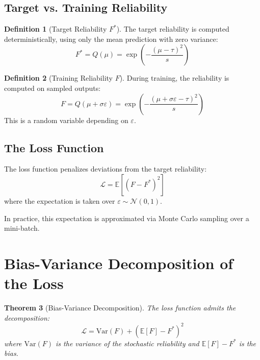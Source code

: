 \documentclass[11pt,a4paper]{article}
\newtheorem{theorem}{Theorem}
\theoremstyle{definition}
\newtheorem{definition}[theorem]{Definition}
\newcommand{\E}{\mathbb{E}}
\newcommand{\Var}{\mathrm{Var}}
\newcommand{\N}{\mathcal{N}}
\begin{document}
\subsection{Target vs. Training Reliability}

\begin{definition}[Target Reliability $F^*$]
The target reliability is computed deterministically, using only the mean prediction with zero variance:
\begin{equation}
    F^* = Q(\mu) = \exp\left(-\frac{(\mu - \tau)^2}{s}\right)
\end{equation}
\end{definition}

\begin{definition}[Training Reliability $F$]
During training, the reliability is computed on sampled outputs:
\begin{equation}
    F = Q(\mu + \sigma\varepsilon) = \exp\left(-\frac{(\mu + \sigma\varepsilon - \tau)^2}{s}\right)
\end{equation}
This is a random variable depending on $\varepsilon$.
\end{definition}

\subsection{The Loss Function}

The loss function penalizes deviations from the target reliability:
\begin{equation}
    \mathcal{L} = \E\left[(F - F^*)^2\right]
\end{equation}
where the expectation is taken over $\varepsilon \sim \N(0, 1)$.

In practice, this expectation is approximated via Monte Carlo sampling over a mini-batch.

\section{Bias-Variance Decomposition of the Loss}

\begin{theorem}[Bias-Variance Decomposition]
\label{thm:bias-variance}
The loss function admits the decomposition:
\begin{equation}
    \mathcal{L} = \Var(F) + \left(\E[F] - F^*\right)^2
\end{equation}
where $\Var(F)$ is the variance of the stochastic reliability and $\E[F] - F^*$ is the bias.
\end{theorem}
\end{document}
